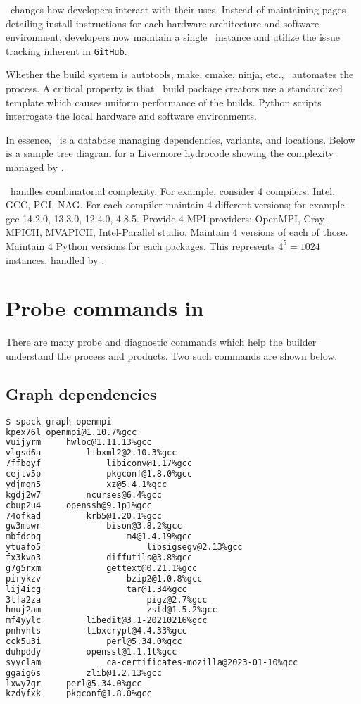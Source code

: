 \documentclass[10pt, oneside]{article}   	%
\begin{document}
\spack \ changes how developers interact with their uses. Instead of maintaining pages detailing install instructions for each hardware architecture and software environment, developers now maintain a single \spack \ instance and utilize the issue tracking inherent in \href{https://github.com/spack/spack}{\texttt{GitHub}}.

Whether the build system is autotools, make, cmake, ninja, etc., \spack \ automates the process. A critical property is that \spack \ build package creators use a standardized template which causes uniform performance of the builds. Python scripts interrogate the local hardware and software environments. 

In essence, \spack \ is a database managing dependencies, variants, and locations. Below is a sample tree diagram for a Livermore hydrocode showing the complexity managed by \spack.

\spack \ handles combinatorial complexity. For example, consider 4 compilers: Intel, GCC, PGI, NAG. For each compiler maintain 4 different versions; for example gcc 14.2.0, 13.3.0, 12.4.0, 4.8.5. Provide 4 MPI providers: OpenMPI, Cray-MPICH, MVAPICH, Intel-Parallel studio. Maintain 4 versions of each of those. Maintain 4 Python versions for each packages. This represents $4^{5} = 1024$ instances, handled by \spack. 

\section{Probe commands in \spack}
There are many probe and diagnostic commands which help the builder understand the process and products. Two such commands are shown below.
\subsection{Graph dependencies}

\small{
\begin{lstlisting}[language=bash]
$ spack graph openmpi
kpex76l openmpi@1.10.7%gcc
vuijyrm     hwloc@1.11.13%gcc
vlgsd6a         libxml2@2.10.3%gcc
7ffbqyf             libiconv@1.17%gcc
cejtv5p             pkgconf@1.8.0%gcc
ydjmqn5             xz@5.4.1%gcc
kgdj2w7         ncurses@6.4%gcc
cbup2u4     openssh@9.1p1%gcc
74ofkad         krb5@1.20.1%gcc
gw3muwr             bison@3.8.2%gcc
mbfdcbq                 m4@1.4.19%gcc
ytuafo5                     libsigsegv@2.13%gcc
fx3kvo3             diffutils@3.8%gcc
g7g5rxm             gettext@0.21.1%gcc
pirykzv                 bzip2@1.0.8%gcc
lij4icg                 tar@1.34%gcc
3tfa2za                     pigz@2.7%gcc
hnuj2am                     zstd@1.5.2%gcc
mf4yylc         libedit@3.1-20210216%gcc
pnhvhts         libxcrypt@4.4.33%gcc
cck5u3i             perl@5.34.0%gcc
duhpddy         openssl@1.1.1t%gcc
syyclam             ca-certificates-mozilla@2023-01-10%gcc
ggaig6s         zlib@1.2.13%gcc
lxwy7gr     perl@5.34.0%gcc
kzdyfxk     pkgconf@1.8.0%gcc
\end{lstlisting}
}
\end{document}
